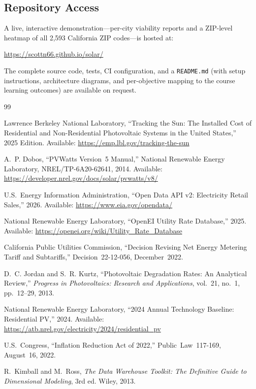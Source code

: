 \documentclass[10pt, conference]{IEEEtran}
\begin{document}
\subsection{Repository Access}

A live, interactive demonstration---per-city viability reports and a
ZIP-level heatmap of all 2{,}593 California ZIP codes---is hosted at:

\begin{center}
\url{https://scottn66.github.io/solar/}
\end{center}

\noindent The complete source code, tests, CI configuration, and a
\texttt{README.md} (with setup instructions, architecture diagrams, and
per-objective mapping to the course learning outcomes) are available on
request.

\begin{thebibliography}{99}

Lawrence Berkeley National Laboratory, ``Tracking the Sun: The Installed Cost of Residential and Non-Residential Photovoltaic Systems in the United States,'' 2025 Edition. Available: \url{https://emp.lbl.gov/tracking-the-sun}

A.~P. Dobos, ``PVWatts Version~5 Manual,'' National Renewable Energy Laboratory, NREL/TP-6A20-62641, 2014. Available: \url{https://developer.nrel.gov/docs/solar/pvwatts/v8/}

U.S.\ Energy Information Administration, ``Open Data API v2: Electricity Retail Sales,'' 2026. Available: \url{https://www.eia.gov/opendata/}

National Renewable Energy Laboratory, ``OpenEI Utility Rate Database,'' 2025. Available: \url{https://openei.org/wiki/Utility_Rate_Database}

California Public Utilities Commission, ``Decision Revising Net Energy Metering Tariff and Subtariffs,'' Decision~22-12-056, December~2022.

D.~C. Jordan and S.~R. Kurtz, ``Photovoltaic Degradation Rates: An Analytical Review,'' \emph{Progress in Photovoltaics: Research and Applications}, vol.~21, no.~1, pp.~12--29, 2013.

National Renewable Energy Laboratory, ``2024 Annual Technology Baseline: Residential PV,'' 2024. Available: \url{https://atb.nrel.gov/electricity/2024/residential_pv}

U.S.\ Congress, ``Inflation Reduction Act of 2022,'' Public~Law~117-169, August~16, 2022.

R.~Kimball and M.~Ross, \emph{The Data Warehouse Toolkit: The Definitive Guide to Dimensional Modeling}, 3rd ed. Wiley, 2013.

\end{thebibliography}
\end{document}
